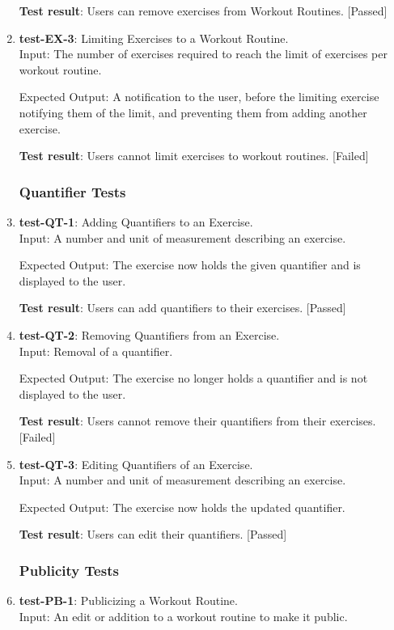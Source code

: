 \documentclass[12pt, titlepage]{article}
\begin{document}
\begin{enumerate}
    \textbf{Test result}: Users can remove exercises from Workout Routines. [Passed]
   
    \item{\textbf{test-EX-3}}: Limiting Exercises to a Workout Routine.\\
    Input: The number of exercises required to reach the limit of exercises per workout routine. 
	
    Expected Output: A notification to the user, before the limiting exercise notifying them of the limit, and preventing them from adding another exercise.
    
    \textbf{Test result}: Users cannot limit exercises to workout routines. [Failed]
   
\subsubsection{Quantifier Tests}
    \item{\textbf{test-QT-1}}: Adding Quantifiers to an Exercise.\\
    Input: A number and unit of measurement describing an exercise.
	
    Expected Output: The exercise now holds the given quantifier and is displayed to the user.
    
    \textbf{Test result}: Users can add quantifiers to their exercises. [Passed]
   
    \item{\textbf{test-QT-2}}: Removing Quantifiers from an Exercise.\\
    Input: Removal of a quantifier.
	
    Expected Output: The exercise no longer holds a quantifier and is not displayed to the user.
    
    \textbf{Test result}: Users cannot remove their quantifiers from their exercises. [Failed]
   
    \item{\textbf{test-QT-3}}: Editing Quantifiers of an Exercise.\\
    Input: A number and unit of measurement describing an exercise.

    Expected Output: The exercise now holds the updated quantifier.
    
    \textbf{Test result}: Users can edit their quantifiers. [Passed]
   
\subsubsection{Publicity Tests}
    \item{\textbf{test-PB-1}}: Publicizing a Workout Routine.\\
    Input: An edit or addition to a workout routine to make it public.
	

\end{enumerate}
\end{document}
